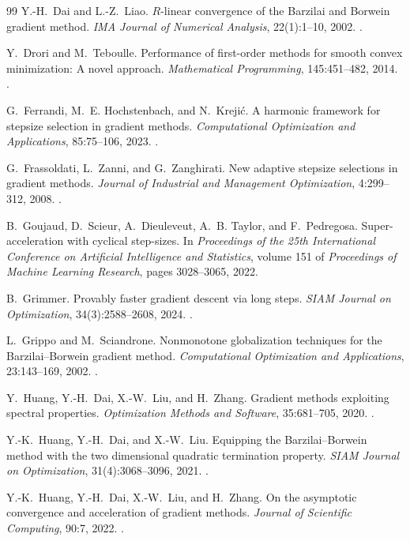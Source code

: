 \begin{thebibliography}{99}
Y.-H.~Dai and L.-Z.~Liao.
$R$-linear convergence of the Barzilai and Borwein gradient method.
\emph{IMA Journal of Numerical Analysis}, 22(1):1--10, 2002.
.

Y.~Drori and M.~Teboulle.
Performance of first-order methods for smooth convex minimization: A novel
approach.
\emph{Mathematical Programming}, 145:451--482, 2014.
.

G.~Ferrandi, M.~E. Hochstenbach, and N.~Kreji\'c.
A harmonic framework for stepsize selection in gradient methods.
\emph{Computational Optimization and Applications}, 85:75--106, 2023.
.

G.~Frassoldati, L.~Zanni, and G.~Zanghirati.
New adaptive stepsize selections in gradient methods.
\emph{Journal of Industrial and Management Optimization}, 4:299--312, 2008.
.

B.~Goujaud, D.~Scieur, A.~Dieuleveut, A.~B. Taylor, and F.~Pedregosa.
Super-acceleration with cyclical step-sizes.
In \emph{Proceedings of the 25th International Conference on Artificial
Intelligence and Statistics}, volume 151 of \emph{Proceedings of Machine
Learning Research}, pages 3028--3065, 2022.

B.~Grimmer.
Provably faster gradient descent via long steps.
\emph{SIAM Journal on Optimization}, 34(3):2588--2608, 2024.
.

L.~Grippo and M.~Sciandrone.
Nonmonotone globalization techniques for the Barzilai--Borwein gradient method.
\emph{Computational Optimization and Applications}, 23:143--169, 2002.
.

Y.~Huang, Y.-H.~Dai, X.-W.~Liu, and H.~Zhang.
Gradient methods exploiting spectral properties.
\emph{Optimization Methods and Software}, 35:681--705, 2020.
.

Y.-K.~Huang, Y.-H.~Dai, and X.-W.~Liu.
Equipping the Barzilai--Borwein method with the two dimensional quadratic
termination property.
\emph{SIAM Journal on Optimization}, 31(4):3068--3096, 2021.
.

Y.-K.~Huang, Y.-H.~Dai, X.-W.~Liu, and H.~Zhang.
On the asymptotic convergence and acceleration of gradient methods.
\emph{Journal of Scientific Computing}, 90:7, 2022.
.


\end{thebibliography}

